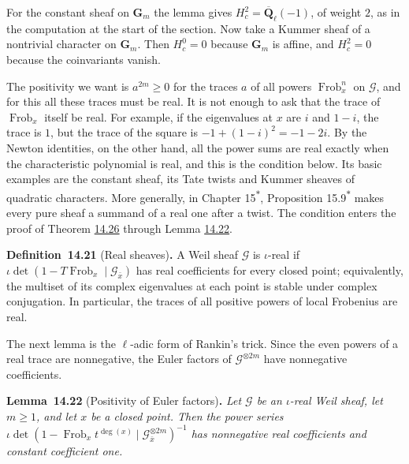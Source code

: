 \documentclass[11pt]{article}
\newenvironment{bpstatement}[2]{\par\addvspace{0.6\baselineskip}\noindent\textbf{#1}#2\textbf{.}\enspace\ignorespaces}
  {\par\addvspace{0.4\baselineskip}}
\newenvironment{bpstatementit}[2]{\begin{bpstatement}{#1}{#2}\itshape\ignorespaces}{\end{bpstatement}}
\newcommand{\bpout}[1]{#1\textsuperscript{\hyperlink{bp-outside}{\ensuremath{\ast}}}}
\begin{document}
\label{bp68}%
For the constant sheaf on \(\mathbf G_m\) the lemma gives \(H^2_c=\overline{\mathbf Q}_\ell(-1)\), of weight \(2\), as in the computation at the start of the section. Now take a Kummer sheaf of a nontrivial character on \(\mathbf G_m\). Then \(H^0_c=0\) because \(\mathbf G_m\) is affine, and \(H^2_c=0\) because the coinvariants vanish.

The positivity we want is \(a^{2m}\ge0\) for the traces \(a\) of all powers \(\operatorname{Frob}_x^n\) on \(\mathcal G\), and for this all these traces must be real. It is not enough to ask that the trace of \(\operatorname{Frob}_x\) itself be real. For example, if the eigenvalues at \(x\) are \(i\) and \(1-i\), the trace is \(1\), but the trace of the square is \(-1+(1-i)^2=-1-2i\). By the Newton identities, on the other hand, all the power sums are real exactly when the characteristic polynomial is real, and this is the condition below. Its basic examples are the constant sheaf, its Tate twists and Kummer sheaves of quadratic characters. More generally, in Chapter \bpout{15}, Proposition \bpout{15.9} makes every pure sheaf a summand of a real one after a twist. The condition enters the proof of Theorem \hyperref[bp82]{14.26} through Lemma \hyperref[bp71]{14.22}.

\label{bp69}%
\begin{bpstatement}{Definition~14.21}{ (Real sheaves)}
A Weil sheaf \(\mathcal G\) is \(\iota\)-real if \(\iota\det(1-T\operatorname{Frob}_x\mid\mathcal G_{\bar x})\) has real coefficients for every closed point; equivalently, the multiset of its complex eigenvalues at each point is stable under complex conjugation.  In particular, the traces of all positive powers of local Frobenius are real.
\end{bpstatement}

\label{bp70}%
The next lemma is the \(\ell\)-adic form of Rankin's trick. Since the even powers of a real trace are nonnegative, the Euler factors of \(\mathcal G^{\otimes2m}\) have nonnegative coefficients.

\label{bp71}%
\begin{bpstatementit}{Lemma~14.22}{ (Positivity of Euler factors)}
Let \(\mathcal G\) be an \(\iota\)-real Weil sheaf, let \(m\ge1\), and let \(x\) be a closed point. Then the power series \(\iota\det(1-\operatorname{Frob}_xt^{\deg(x)}\mid\mathcal G^{\otimes2m}_{\bar x})^{-1}\) has nonnegative real coefficients and constant coefficient one.
\end{bpstatementit}
\end{document}
